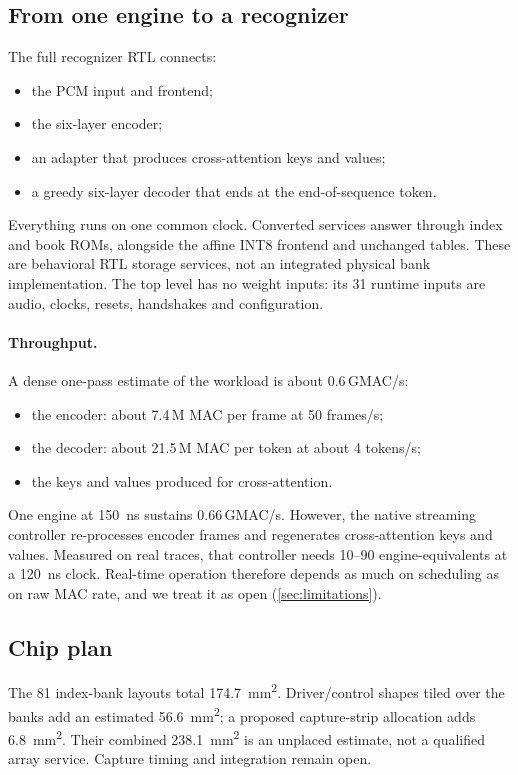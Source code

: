 \subsection{From one engine to a recognizer}
The full recognizer RTL connects:
\begin{itemize}
\item the PCM input and frontend;
\item the six-layer encoder;
\item an adapter that produces cross-attention keys and values;
\item a greedy six-layer decoder that ends at the end-of-sequence token.
\end{itemize}
Everything runs on one common clock. Converted services answer through index and book ROMs, alongside the affine INT8 frontend and unchanged tables. These are behavioral RTL storage services, not an integrated physical bank implementation. The top level has no weight inputs: its 31 runtime inputs are audio, clocks, resets, handshakes and configuration.

\paragraph{Throughput.}
A dense one-pass estimate of the workload is about 0.6\,GMAC/s:
\begin{itemize}
\item the encoder: about 7.4\,M MAC per frame at 50 frames/s;
\item the decoder: about 21.5\,M MAC per token at about 4 tokens/s;
\item the keys and values produced for cross-attention.
\end{itemize}
One engine at \SI{150}{ns} sustains 0.66\,GMAC/s. However, the native streaming controller re-processes encoder frames and regenerates cross-attention keys and values. Measured on real traces, that controller needs 10--90 engine-equivalents at a \SI{120}{ns} clock. Real-time operation therefore depends as much on scheduling as on raw MAC rate, and we treat it as open (\cref{sec:limitations}).

\subsection{Chip plan}
The 81 index-bank layouts total \SI{174.7}{mm^2}. Driver/control shapes tiled over the banks add an estimated \SI{56.6}{mm^2}; a proposed capture-strip allocation adds \SI{6.8}{mm^2}. Their combined \SI{238.1}{mm^2} is an unplaced estimate, not a qualified array service. Capture timing and integration remain open.

